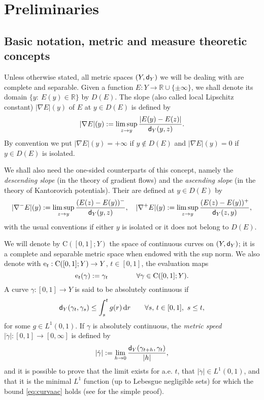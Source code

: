 \documentclass[reqno,11pt]{article}
\numberwithin{equation}{section}
\newcommand{\R}{\mathbb{R}}
\newcommand{\sfd}{{\sf d}}
\renewcommand{\d}{{\mathrm d}}
\newcommand{\e}{{\rm{e}}}                           %
\newcommand{\CC}[2]{\mathrm{C}(#1;#2)}
\begin{document}
\section{Preliminaries}\label{sec:prem}

\subsection{Basic notation, metric and measure theoretic
concepts}\label{sub1}

Unless otherwise stated, all metric spaces $(Y,\sfd_Y)$ we will be
dealing with are complete and separable. Given a function
$E:Y\to\R\cup\{\pm\infty\}$, we shall denote its domain $\{y:\
E(y)\in\R\}$ by $D(E)$. The slope (also called local Lipschitz
constant) $|\nabla E|(y)$ of $E$ at $y\in D(E)$ is defined by
\begin{equation}\label{eq:loclip}
|\nabla E|(y):=\limsup_{z\to y}\frac{|E(y)-E(z)|}{\sfd_Y(y,z)}.
\end{equation}
By convention we put $|\nabla E|(y)=+\infty$ if $y\notin D(E)$ and
$|\nabla E|(y)=0$ if $y\in D(E)$ is isolated.

We shall also need the one-sided counterparts of this concept,
namely the \emph{descending slope} (in the theory of gradient flows)
and the \emph{ascending slope} (in the theory of Kantorovich
potentials). Their are defined at $y\in D(E)$ by
\[
|\nabla^-E|(y):=\limsup_{z\to y}\frac{(E(z)-E(y))^-}{\sfd_Y(y,z)},
\quad
|\nabla^+E|(y):=\limsup_{z\to y}\frac{(E(z)-E(y))^+}{\sfd_Y(z,y)},
\]
with the usual conventions if either $y$ is isolated or it does not
belong to $D(E)$.

We will denote by $\CC{[0,1]}{Y}$ the space of continuous curves on
$(Y,\sfd_Y)$; it is a complete and separable metric space when
endowed with the sup norm. We also denote with $\e_t: \CC{[0,1]}Y\to
Y$, $t\in[0,1]$, the evaluation maps
\[
\e_t(\gamma):=\gamma_t\qquad\qquad\forall\gamma\in \CC{[0,1]}Y.
\]
A curve $\gamma:[0,1]\to Y$ is said to be absolutely continuous if
\begin{equation}
\label{eq:curvaac} \sfd_Y(\gamma_t,\gamma_s)\leq\int_s^tg(r)\,\d r
\qquad\forall s,\,t\in [0,1],\,\,s\leq t,
\end{equation}
for some $g\in L^1(0,1)$. If $\gamma$ is absolutely continuous, the
\emph{metric speed} $|\dot\gamma|:[0,1]\to[0,\infty]$ is defined by
\[
|\dot\gamma|:=\lim_{h\to0}\frac{\sfd_Y(\gamma_{t+h},\gamma_t)}{|h|},
\]
and it is possible to prove that the limit exists for a.e. $t$, that
$|\dot\gamma|\in L^1(0,1)$, and that it is the minimal $L^1$
function (up to Lebesgue negligible sets) for which the bound
\eqref{eq:curvaac} holds (see
\cite[Theorem~1.1.2]{Ambrosio-Gigli-Savare08} for the simple proof).
\end{document}
